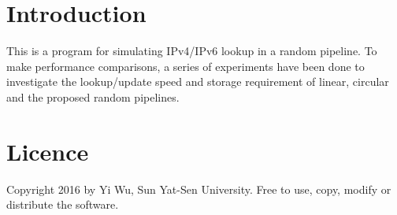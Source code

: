 \section*{Introduction}





This is a program for simulating I\-Pv4/\-I\-Pv6 lookup in a random pipeline. To make performance comparisons, a series of experiments have been done to investigate the lookup/update speed and storage requirement of linear, circular and the proposed random pipelines.

\section*{Licence}





Copyright 2016 by Yi Wu, Sun Yat-\/\-Sen University. Free to use, copy, modify or distribute the software.